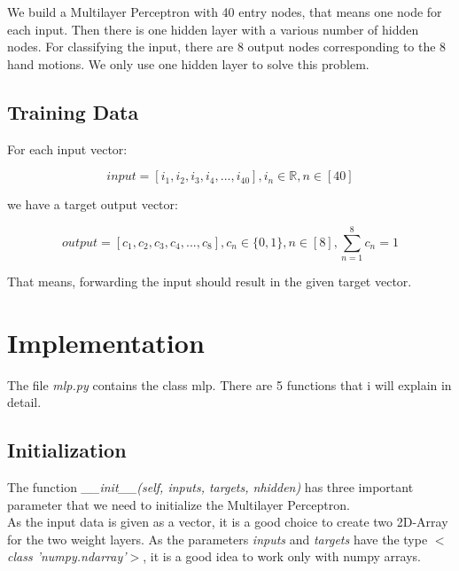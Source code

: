\documentclass[10pt,a4paper]{article}
\begin{document}
	We build a Multilayer Perceptron with 40 entry nodes, that means one node for each input. Then there is one hidden layer with a various number of hidden nodes. For classifying the input, there are 8 output nodes corresponding to the 8 hand motions. We only use one hidden layer to solve this problem.

	\subsection{Training Data}							%
	For each input vector:
	\begin{center}

		\begin{equation}
		input = [i_1,i_2,i_3,i_4,...,i_{40}], i_n \in  \mathbb{R},n \in [40]
		\end{equation}
	\end{center}
	we have a target output vector:
	\begin{center}
		\begin{equation}
		 output = [c_1,c_2,c_3,c_4,...,c_8], c_n \in \{0,1\}, n \in [8],\sum_{n=1}^{8} c_n  = 1 
		 \end{equation}  
	\end{center}
	That means, forwarding the input should result in the given target vector. 
	\section{Implementation}
	The file \textit{mlp.py} contains the class mlp. There are 5 functions that i will explain in detail.
	\subsection{Initialization}								%
	The function \textit{ \_\_init\_\_(self, inputs, targets, nhidden)} has three important parameter that we need to initialize the Multilayer Perceptron. \\
	As the input data is given as a vector, it is a good choice to create two 2D-Array for the two weight layers. As the parameters \textit{inputs} and \textit{targets} have the type \textit{$<$class 'numpy.ndarray'$>$}, it is a good idea to work only with numpy arrays. \\
\end{document}
